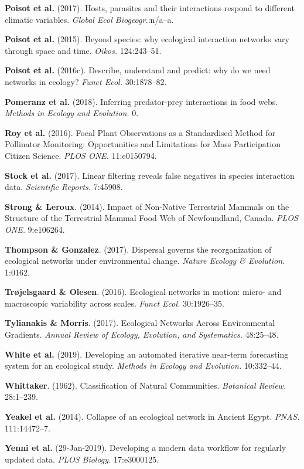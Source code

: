 \leavevmode\hypertarget{ref-PoisGuev17}{}%
\textbf{Poisot et al.} (2017). Hosts, parasites and their interactions
respond to different climatic variables. \emph{Global Ecol
Biogeogr.}:n/a--a.

\leavevmode\hypertarget{ref-PoisStou15}{}%
\textbf{Poisot et al.} (2015). Beyond species: why ecological
interaction networks vary through space and time. \emph{Oikos.}
124:243--51.

\leavevmode\hypertarget{ref-PoisStou16}{}%
\textbf{Poisot et al.} (2016c). Describe, understand and predict: why do
we need networks in ecology? \emph{Funct Ecol.} 30:1878--82.

\leavevmode\hypertarget{ref-PomeThom18}{}%
\textbf{Pomeranz et al.} (2018). Inferring predator-prey interactions in
food webs. \emph{Methods in Ecology and Evolution.} 0.

\leavevmode\hypertarget{ref-RoyBaxt16}{}%
\textbf{Roy et al.} (2016). Focal Plant Observations as a Standardised
Method for Pollinator Monitoring: Opportunities and Limitations for Mass
Participation Citizen Science. \emph{PLOS ONE.} 11:e0150794.

\leavevmode\hypertarget{ref-StocPois17}{}%
\textbf{Stock et al.} (2017). Linear filtering reveals false negatives
in species interaction data. \emph{Scientific Reports.} 7:45908.

\leavevmode\hypertarget{ref-StroLero14}{}%
\textbf{Strong \& Leroux}. (2014). Impact of Non-Native Terrestrial
Mammals on the Structure of the Terrestrial Mammal Food Web of
Newfoundland, Canada. \emph{PLOS ONE.} 9:e106264.

\leavevmode\hypertarget{ref-ThomGonz17}{}%
\textbf{Thompson \& Gonzalez}. (2017). Dispersal governs the
reorganization of ecological networks under environmental change.
\emph{Nature Ecology \& Evolution.} 1:0162.

\leavevmode\hypertarget{ref-TrojOles16}{}%
\textbf{Trøjelsgaard \& Olesen}. (2016). Ecological networks in motion:
micro- and macroscopic variability across scales. \emph{Funct Ecol.}
30:1926--35.

\leavevmode\hypertarget{ref-TyliMorr17}{}%
\textbf{Tylianakis \& Morris}. (2017). Ecological Networks Across
Environmental Gradients. \emph{Annual Review of Ecology, Evolution, and
Systematics.} 48:25--48.

\leavevmode\hypertarget{ref-WhitYenn19}{}%
\textbf{White et al.} (2019). Developing an automated iterative
near-term forecasting system for an ecological study. \emph{Methods in
Ecology and Evolution.} 10:332--44.

\leavevmode\hypertarget{ref-Whit62}{}%
\textbf{Whittaker}. (1962). Classification of Natural Communities.
\emph{Botanical Review.} 28:1--239.

\leavevmode\hypertarget{ref-YeakPire14}{}%
\textbf{Yeakel et al.} (2014). Collapse of an ecological network in
Ancient Egypt. \emph{PNAS.} 111:14472--7.

\leavevmode\hypertarget{ref-YennChri19}{}%
\textbf{Yenni et al.} (29-Jan-2019). Developing a modern data workflow
for regularly updated data. \emph{PLOS Biology.} 17:e3000125. 
